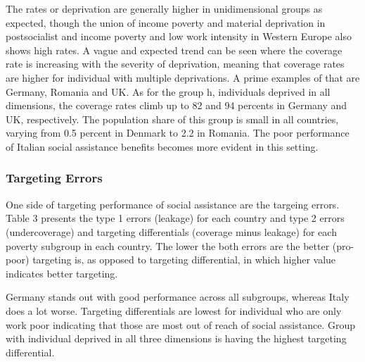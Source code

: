 \documentclass[11pt, a4paper]{article}\usepackage{graphicx, color}
\begin{document}
The rates or deprivation are generally higher in unidimensional groups as expected, though the union of income poverty and material deprivation in postsocialist and income poverty and low work intensity in Western Europe also shows high rates. A vague and expected trend can be seen where the coverage rate is increasing with the severity of deprivation, meaning that coverage rates are higher for individual with multiple deprivations. A prime examples of that are Germany, Romania and UK. As for the group h, individuals deprived in all dimensions, the coverage rates climb up to 82 and 94 percents in Germany and UK, respectively. The population share of this group is small in all countries, varying from 0.5 percent in Denmark to 2.2 in Romania. The poor performance of Italian social assistance benefits becomes more evident in this setting.

\subsubsection*{Targeting Errors}

One side of targeting performance of social assistance are the targeing errors. Table 3 presents the type 1 errors (leakage) for each country and type 2 errors (undercoverage) and targeting differentials (coverage minus leakage) for each poverty subgroup in each country. The lower the both errors are the better (pro-poor) targeting is, as opposed to targeting differential, in which higher value indicates better targeting.

Germany stands out with good performance across all subgroups, whereas Italy does a lot worse. Targeting differentials are lowest for individual who are only work poor indicating that those are most out of reach of social assistance. Group with individual deprived in all three dimensions is having the highest targeting differential.




\end{document}
